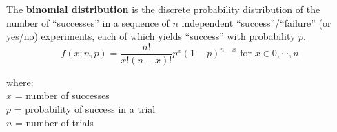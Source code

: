 % 


\begin{frame}
  \vspace*{.3cm}
  The \textbf{binomial distribution} is the discrete probability distribution of the number of ``successes'' in a sequence of $n$ independent ``success''/``failure'' (or yes/no) experiments, each of which yields ``success'' with probability $p$.
  \vspace*{.3cm}
  $$ f(x;n,p) = \frac{n!}{x!(n-x)!}  p^x(1-p)^{n-x} \mbox{     for } x \in {0, \cdots, n}$$
  \begin{tabbing}
    where: \hspace*{.25cm} \= \\
    \hspace*{.1cm} \> $ x $ = number of successes \\
    \hspace*{.1cm} \> $ p $ = probability of success in a trial \\
    \hspace*{.1cm} \> $ n $ = number of trials \\
  \end{tabbing}
\end{frame}

